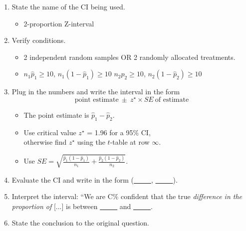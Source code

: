 \begin{termBox}{
\begin{enumerate}
\setlength{\itemsep}{0mm}
\item State the name of the CI being used.\vspace{-1.5mm}
\begin{itemize}
\item 2-proportion Z-interval
\end{itemize}
\item Verify conditions.\vspace{-1.5mm}
\begin{itemize}
\item 2 independent random samples OR 2 randomly allocated treatments.
\item $n_1\hat{p}_1\geq10$, $n_1(1-\hat{p}_1)\geq10$  \newline $n_2\hat{p}_2\geq10$, $n_2(1-\hat{p}_2)\geq10$
\end{itemize}
\item Plug in the numbers and write the interval in the form
$$\text{point estimate}\ \pm \ z^{\star} \times SE \ \text{of estimate}$$
\begin{itemize}
\item The point estimate is $\hat{p}_1-\hat{p}_2$.
\item Use critical value $z^{\star}$ = 1.96 for a 95\% CI,\\
	otherwise find $z^{\star}$ using the $t$-table at row $\infty$.
\item Use $SE = \sqrt{\frac{\hat{p}_1(1-\hat{p}_1)}{n_1} + \frac{\hat{p}_2(1-\hat{p}_2)}{n_2}}$.
\end{itemize}
\item Evaluate the CI and write in the form (\underline{\ \ \ \ \ }, \underline{\ \ \ \ \ }).
\item Interpret the interval: ``We are C\% confident that the true \emph{difference in the proportion of} [...] is between \underline{\ \ \ \ \ } and \underline{\ \ \ \ \ }.
\item State the conclusion to the original question.
\end{enumerate}}
\end{termBox}
\textA{\newpage}

